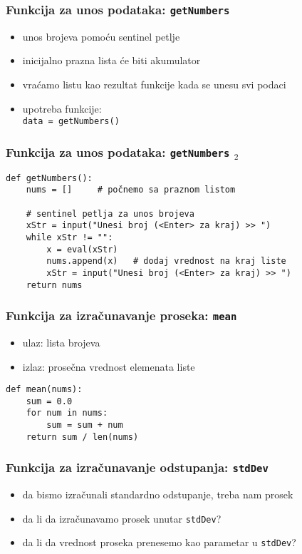 \documentclass[utf8,compress,aspectratio=169]{beamer}
\begin{document}
\begin{frame}[fragile]
  \frametitle{Funkcija za unos podataka: \texttt{getNumbers}}
  \begin{itemize}
    \item unos brojeva pomoću sentinel petlje
    \item inicijalno prazna lista će biti akumulator
    \item vraćamo listu kao rezultat funkcije kada se unesu svi podaci
    \item upotreba funkcije: \\
    \texttt{data = getNumbers()}
  \end{itemize}
\end{frame}

\begin{frame}[fragile]
  \frametitle{Funkcija za unos podataka: \texttt{getNumbers} $_2$}
\begin{verbatim}
def getNumbers():
    nums = []     # počnemo sa praznom listom

    # sentinel petlja za unos brojeva
    xStr = input("Unesi broj (<Enter> za kraj) >> ")
    while xStr != "":
        x = eval(xStr)
        nums.append(x)   # dodaj vrednost na kraj liste
        xStr = input("Unesi broj (<Enter> za kraj) >> ")
    return nums
\end{verbatim}
\end{frame}

\begin{frame}[fragile]
  \frametitle{Funkcija za izračunavanje proseka: \texttt{mean}}
  \begin{itemize}
    \item ulaz: lista brojeva
    \item izlaz: prosečna vrednost elemenata liste
  \end{itemize}
\begin{verbatim}
def mean(nums):
    sum = 0.0
    for num in nums:
        sum = sum + num
    return sum / len(nums)
\end{verbatim}
\end{frame}

\begin{frame}[fragile]
  \frametitle{Funkcija za izračunavanje odstupanja: \texttt{stdDev}}
  \begin{itemize}
    \item da bismo izračunali standardno odstupanje, treba nam prosek
    \item da li da izračunavamo prosek unutar \texttt{stdDev}?
    \item da li da vrednost proseka prenesemo kao parametar u \texttt{stdDev}?
  \end{itemize}
\end{frame}
\end{document}
